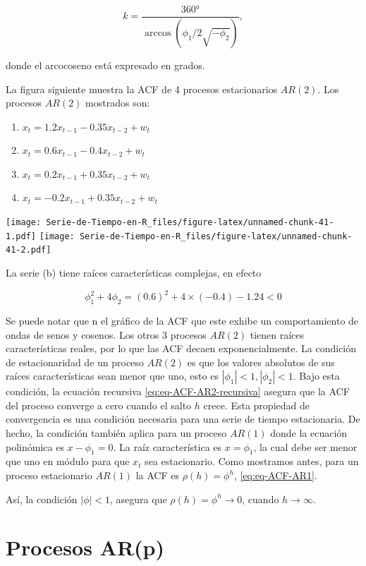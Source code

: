\documentclass[12pt,]{krantz}
\theoremstyle{definition}
\theoremstyle{definition}
\theoremstyle{definition}
\theoremstyle{remark}
\begin{document}
\[k=\frac{360°}{\arccos(\phi_1/2\sqrt{-\phi_2})},\]

donde el arcocoseno está expresado en grados.

La figura siguiente muestra la ACF de 4 procesos estacionarios
\(AR(2)\). Los procesos \(AR(2)\) mostrados son:

\begin{enumerate}
\def\labelenumi{\alph{enumi})}
\item
  \(x_t=1.2x_{t-1}-0.35x_{t-2}+w_t\)
\item
  \(x_t=0.6x_{t-1}-0.4x_{t-2}+w_t\)
\item
  \(x_t=0.2x_{t-1}+0.35x_{t-2}+w_t\)
\item
  \(x_t=-0.2x_{t-1}+0.35x_{t-2}+w_t\)
\end{enumerate}

\texttt{[image: Serie-de-Tiempo-en-R\_files/figure-latex/unnamed-chunk-41-1.pdf]}
\texttt{[image: Serie-de-Tiempo-en-R\_files/figure-latex/unnamed-chunk-41-2.pdf]}

La serie (b) tiene raíces características complejas, en efecto

\[\phi_1^2+4\phi_2=(0.6)^2+4\times(-0.4)-1.24<0\]

Se puede notar que n el gráfico de la ACF que este exhibe un
comportamiento de ondas de senos y cosenos. Los otros 3 procesos
\(AR(2)\) tienen raíces características reales, por lo que las ACF
decaen exponencialmente. La condición de estacionaridad de un proceso
\(AR(2)\) es que los valores absolutos de sus raíces características
sean menor que uno, esto es \(|\phi_1|<1, |\phi_2|<1\). Bajo esta
condición, la ecuación recursiva \eqref{eq:eq-ACF-AR2-recursiva} asegura
que la ACF del proceso converge a cero cuando el salto \(h\) crece. Esta
propiedad de convergencia es una condición necesaria para una serie de
tiempo estacionaria. De hecho, la condición también aplica para un
proceso \(AR(1)\) donde la ecuación polinómica es \(x-\phi_1=0\). La
raíz característica es \(x=\phi_1\), la cual debe ser menor que uno en
módulo para que \(x_t\) sea estacionario. Como mostramos antes, para un
proceso estacionario \(AR(1)\) la ACF es \(\rho(h)=\phi^h\),
\eqref{eq:eq-ACF-AR1}.

Así, la condición \(|\phi|<1\), asegura que \(\rho(h)=\phi^h\to0\),
cuando \(h\to\infty\).

\section{Procesos AR(p)}\label{procesos-arp}
\end{document}
